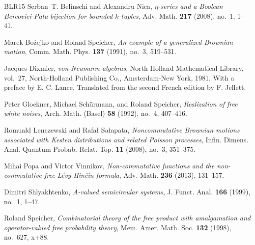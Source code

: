 \documentclass[12pt]{amsart}
\theoremstyle{definition}
\begin{document}
\begin{thebibliography}{BLR15}
Serban~T. Belinschi and Alexandru Nica, \emph{{$\eta$}-series and a {B}oolean
  {B}ercovici-{P}ata bijection for bounded {$k$}-tuples}, Adv. Math.
  \textbf{217} (2008), no.~1, 1--41. 

Marek Bo{\.z}ejko and Roland Speicher, \emph{An example of a generalized
  {B}rownian motion}, Comm. Math. Phys. \textbf{137} (1991), no.~3, 519--531.

Jacques Dixmier, \emph{von {N}eumann algebras}, North-Holland Mathematical
  Library, vol.~27, North-Holland Publishing Co., Amsterdam-New York, 1981,
  With a preface by E. C. Lance, Translated from the second French edition by
  F. Jellett. 

Peter Glockner, Michael Sch{\"u}rmann, and Roland Speicher, \emph{Realization
  of free white noises}, Arch. Math. (Basel) \textbf{58} (1992), no.~4,
  407--416. 

Romuald Lenczewski and Rafa{\l} Sa{\l}apata, \emph{Noncommutative {B}rownian
  motions associated with {K}esten distributions and related {P}oisson
  processes}, Infin. Dimens. Anal. Quantum Probab. Relat. Top. \textbf{11}
  (2008), no.~3, 351--375. 

Mihai Popa and Victor Vinnikov, \emph{Non-commutative functions and the
  non-commutative free {L}\'evy-{H}in\v cin formula}, Adv. Math. \textbf{236}
  (2013), 131--157. 

Dimitri Shlyakhtenko, \emph{{$A$}-valued semicircular systems}, J. Funct. Anal.
  \textbf{166} (1999), no.~1, 1--47. 

Roland Speicher, \emph{Combinatorial theory of the free product with
  amalgamation and operator-valued free probability theory}, Mem. Amer. Math.
  Soc. \textbf{132} (1998), no.~627, x+88. 

\end{thebibliography}




%
%
\end{document}
